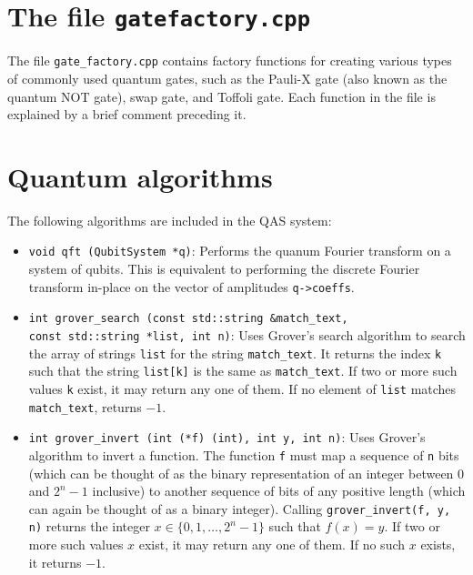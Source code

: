 \documentclass{article}
\begin{document}
\section{The file \texttt{gate\textunderscore{}factory.cpp}} 

The file \verb~gate_factory.cpp~ contains factory functions for creating various types of commonly used quantum gates, such as the Pauli-X gate (also known as the quantum NOT gate), swap gate, and Toffoli gate. Each function in the file is explained by a brief comment preceding it. 


\section{Quantum algorithms} 

The following algorithms are included in the QAS system: 
\begin{itemize} 
\item \verb~void qft (QubitSystem *q)~: Performs the quanum Fourier transform on a system of qubits. This is equivalent to performing the discrete Fourier transform in-place on the vector of amplitudes \verb~q->coeffs~. 

\item \verb~int grover_search (const std::string &match_text,~ \\
\verb~const std::string *list, int n)~: Uses Grover's search algorithm to search the array of strings \verb~list~ for the string \verb~match_text~. It returns the index \verb~k~ such that the string \verb~list[k]~ is the same as \verb~match_text~. If two or more such values \verb~k~ exist, it may return any one of them. If no element of \verb~list~ matches \verb~match_text~, returns $-1$. 

\item \verb~int grover_invert (int (*f) (int), int y, int n)~: Uses Grover's algorithm to invert a function. The function \verb~f~ must map a sequence of \verb~n~ bits (which can be thought of as the binary representation of an integer between 0 and $2^n - 1$ inclusive) to another sequence of bits of any positive length (which can again be thought of as a binary integer). Calling \verb~grover_invert(f, y, n)~ returns the integer $x \in \{0, 1, \dots, 2^n-1\}$ such that $f(x) = y$. If two or more such values $x$ exist, it may return any one of them. If no such $x$ exists, it returns $-1$. 

\end{itemize} 
\end{document}
